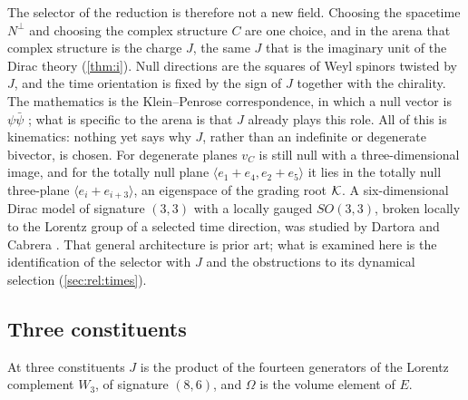 The selector of the reduction is therefore not a new field. Choosing the spacetime $N^\perp$ and choosing the complex structure $C$ are one choice, and in the arena that
complex structure is the charge $J$, the same $J$ that is the imaginary unit of the Dirac theory (\cref{thm:i}). Null directions are the squares of Weyl spinors twisted
by $J$, and the time orientation is fixed by the sign of $J$ together with the chirality. The mathematics is the Klein--Penrose correspondence, in which a null vector is
$\psi\bar\psi$ \cite{Penrose60,PenroseRindler84,WardWells}; what is specific to the arena is that $J$ already plays this role. All of this is kinematics: nothing yet says why $J$,
rather than an indefinite or degenerate bivector, is chosen. For degenerate planes $v_C$ is still null with a three-dimensional image, and for the totally null plane
$\langle e_1+e_4,e_2+e_5\rangle$ it lies in the totally null three-plane $\langle e_i+e_{i+3}\rangle$, an eigenspace of the grading root $\mathcal K$.
A six-dimensional Dirac model of signature $(3,3)$ with a locally gauged $SO(3,3)$, broken locally to the Lorentz group of a selected time
direction, was studied by Dartora and Cabrera \cite{DartoraCabrera10}. That general architecture is prior art; what is examined here is the
identification of the selector with $J$ and the obstructions to its dynamical selection (\cref{sec:rel:times}).

\subsection{Three constituents}

At three constituents $J$ is the product of the fourteen generators of the Lorentz complement $W_3$, of signature $(8,6)$, and $\Omega$ is the volume element of $E$.


